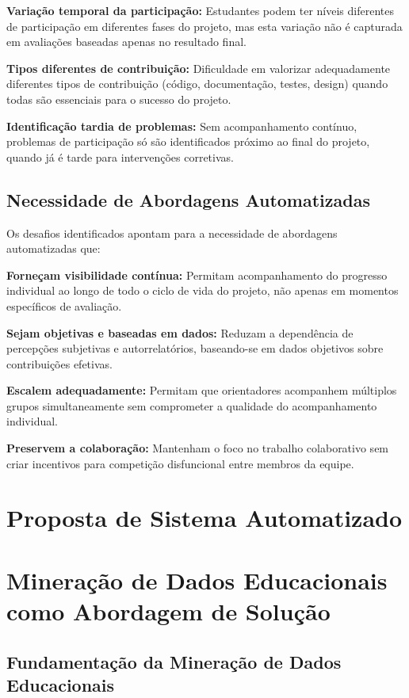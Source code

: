 \documentclass[english, spanish, brazilian]{RBIEarticle} %
\begin{document}
\textbf{Variação temporal da participação:} Estudantes podem ter níveis diferentes de participação em diferentes fases do projeto, mas esta variação não é capturada em avaliações baseadas apenas no resultado final.

\textbf{Tipos diferentes de contribuição:} Dificuldade em valorizar adequadamente diferentes tipos de contribuição (código, documentação, testes, design) quando todas são essenciais para o sucesso do projeto.

\textbf{Identificação tardia de problemas:} Sem acompanhamento contínuo, problemas de participação só são identificados próximo ao final do projeto, quando já é tarde para intervenções corretivas.

\subsection{Necessidade de Abordagens Automatizadas}

Os desafios identificados apontam para a necessidade de abordagens automatizadas que:

\textbf{Forneçam visibilidade contínua:} Permitam acompanhamento do progresso individual ao longo de todo o ciclo de vida do projeto, não apenas em momentos específicos de avaliação.

\textbf{Sejam objetivas e baseadas em dados:} Reduzam a dependência de percepções subjetivas e autorrelatórios, baseando-se em dados objetivos sobre contribuições efetivas.

\textbf{Escalem adequadamente:} Permitam que orientadores acompanhem múltiplos grupos simultaneamente sem comprometer a qualidade do acompanhamento individual.

\textbf{Preservem a colaboração:} Mantenham o foco no trabalho colaborativo sem criar incentivos para competição disfuncional entre membros da equipe.

\section{Proposta de Sistema Automatizado}

\section{Mineração de Dados Educacionais como Abordagem de Solução}

\subsection{Fundamentação da Mineração de Dados Educacionais}
\end{document}
